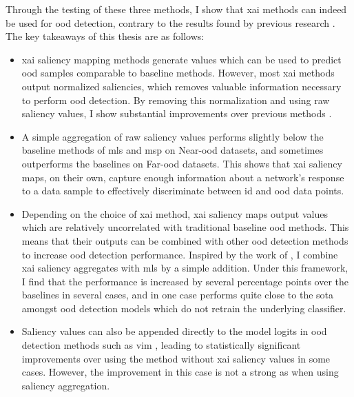 \documentclass[UKenglish]{uiomasterthesis} %
\theoremstyle{definition}
\begin{document}
Through the testing of these three methods, I show that \ac{xai} methods can indeed be used for \ac{ood} detection, contrary to the results found by previous research \cite{martinez}. The key takeaways of this thesis are as follows:

\begin{itemize}
    \item \ac{xai} saliency mapping methods generate values which can be used to predict \ac{ood} samples comparable to baseline methods. However, most \ac{xai} methods output normalized saliencies, which removes valuable information necessary to perform \ac{ood} detection. By removing this normalization and using raw saliency values, I show substantial improvements over previous methods \cite{martinez}.
    \item A simple aggregation of raw saliency values performs slightly below the baseline methods of \ac{mls} and \ac{msp} on Near-\ac{ood} datasets, and sometimes outperforms the baselines on Far-\ac{ood} datasets. This shows that \ac{xai} saliency maps, on their own, capture enough information about a network's response to a data sample to effectively discriminate between \ac{id} and \ac{ood} data points.%
    \item Depending on the choice of \ac{xai} method, \ac{xai} saliency maps output values which are relatively uncorrelated with traditional baseline \ac{ood} methods. This means that their outputs can be combined with other \ac{ood} detection methods to increase \ac{ood} detection performance. Inspired by the work of \cite{combood}, I combine \ac{xai} saliency aggregates with \ac{mls} by a simple addition. Under this framework, I find that the performance is increased by several percentage points over the baselines in several cases, and in one case performs quite close to the \ac{sota} amongst \ac{ood} detection models which do not retrain the underlying classifier.
    \item Saliency values can also be appended directly to the model logits in \ac{ood} detection methods such as \ac{vim} \cite{vim}, leading to statistically significant improvements over using the method without \ac{xai} saliency values in some cases. However, the improvement in this case is not a strong as when using saliency aggregation.
\end{itemize}
\end{document}
